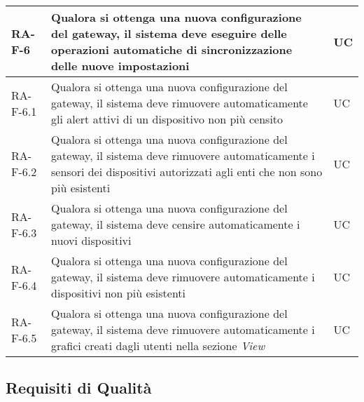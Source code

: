 \begin{center}
\begin{longtable}{|p{3cm}|p{9.85cm}|p{2cm}|}
		\textbf{RA-F-6} & Qualora si ottenga una nuova configurazione del gateway, il sistema deve eseguire delle operazioni automatiche di sincronizzazione delle nuove impostazioni & UC \\ \hline
		{\color{gray} RA-F-}6.1 & Qualora si ottenga una nuova configurazione del gateway, il sistema deve rimuovere automaticamente gli alert attivi di un dispositivo non più censito  & UC \\ \hline
		{\color{gray} RA-F-}6.2 & Qualora si ottenga una nuova configurazione del gateway, il sistema deve rimuovere automaticamente i sensori dei dispositivi autorizzati agli enti che non sono più esistenti & UC \\ \hline
		{\color{gray} RA-F-}6.3 & Qualora si ottenga una nuova configurazione del gateway, il sistema deve censire automaticamente i nuovi dispositivi & UC \\ \hline
		{\color{gray} RA-F-}6.4 & Qualora si ottenga una nuova configurazione del gateway, il sistema deve rimuovere automaticamente i dispositivi non più esistenti & UC \\ \hline
		{\color{gray} RA-F-}6.5 & Qualora si ottenga una nuova configurazione del gateway, il sistema deve rimuovere automaticamente i grafici creati dagli utenti nella sezione \textit{View} & UC \\ \hline


		\end{longtable}
	\end{center}

	\subsection{Requisiti di Qualità}

